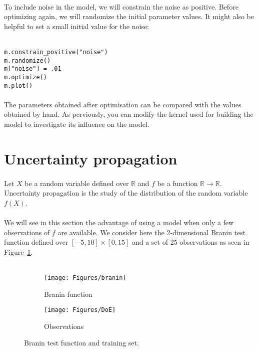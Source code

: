 \documentclass{article}
\begin{document}
\paragraph{}
To include noise in the model, we will constrain the noise as positive.
Before optimizing again, we will randomize the initial parameter values.
It might also be helpful to set a small initial value for the noise:\\ \ \\
\begin{verbatim}
m.constrain_positive("noise")
m.randomize()
m["noise"] = .01
m.optimize()
m.plot()
\end{verbatim}
\paragraph{}
The parameters obtained after optimisation can be compared with the values obtained by hand. As perviously, you can modify the kernel used for building the model to investigate its influence on the model.

\section{Uncertainty propagation}
\paragraph{}
Let $X$ be a random variable defined over $\mathds{R}$ and $f$ be a function $\mathds{R} \rightarrow \mathds{R}$. Uncertainty propagation is the study of the distribution of the random variable $f(X)$. 

\paragraph{}
We will see in this section the advantage of using a model when only a few observations of $f$ are available. We consider here the 2-dimensional Branin test function defined over $[-5,10]\times[0,15]$ and a set of 25 observations as seen in Figure~\ref{fig:branin}. \\ \ \\

\begin{figure}[ht]
    \begin{center}
        \begin{subfigure}[b]{0.5\textwidth}
                \centering
                \texttt{[image: Figures/branin]}
                \caption{Branin function}
        \end{subfigure}%
        \begin{subfigure}[b]{0.5\textwidth}
                \centering
                \texttt{[image: Figures/DoE]}
                \caption{Observations}
        \end{subfigure}%
    \end{center}
    \caption{Branin test function and training set.}
    \label{fig:branin}
\end{figure}
\end{document}
